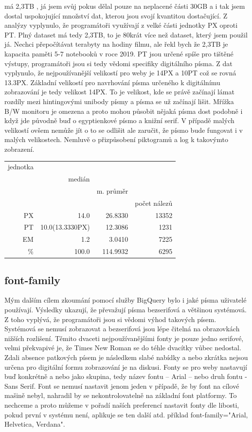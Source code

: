 \documentclass[a4paper]{article}
\begin{document}
{} má 2,3TB , já jsem svůj pokus dělal pouze na neplacené části 30GB a i tak jsem dostal uspokojující množství dat, kterou jsou svojí kvantitou dostačující. Z analýzy vyplynulo, že programátoři využívají z velké části jednotky PX oproti PT. Plný dataset má tedy 2,3TB, to je 80krát více než dataset, který jsem použil já. Nechci přepočítávat terabyty na hodiny filmu, ale řekl bych že 2,3TB je kapacita paměti 5-7 notebooků v roce 2019.  PT jsou určené spíše pro tištěné výstupy, programátoři jsou si tedy vědomi specifiky digitálního písma. Z dat vyplynulo, že nejpoužívanější velikostí pro weby je 14PX a 10PT což se rovná 13.3PX. Základní velikostí pro navrhování písma určeného k digitálnímu zobrazování je tedy velikost 14PX. To je velikost, kde se právě začínají lámat rozdíly mezi hintingovými unibody písmy a písma se už začínají lišit. Mřížka B/W monitoru je omezena a proto mohou působit nějaká písma dost podobně i když jde původně buď o egyptienkové písmo a knižní serif. V případě malých velikostí ovšem nemůže jít o to se odlišit ale zaručit, že písmo bude fungovat i v malých velikostech. Nemluvě o přizpůsobení piktogramů a log k takovýmto zobrazení.

\begin{tabular}{r|rrr}
jednotka & \\
& medián & \\
& & m. průměr & \\
& & & počet nálezů\\
\midrule
PX & 14.0 & 26.8330 &13352 \\
PT & 10.0(13.3330PX)  & 12.3086 & 1231 \\
EM & 1.2 & 3.0410 & 7225 \\
\% & 100.0 & 114.9932 & 6295\\
\end{tabular}

\subsection{font-family}
Mým dalším cílem zkoumání pomocí služby BigQuery bylo i jaké písma uživatelé používají. Výsledky ukazují, že převažují písma bezserifová a většinou systémová. Z toho vyplývá, že programátoři jsou si vědomi výhod takových písem. Systémová se nemusí zobrazovat a bezserifová jsou lépe čitelná na obrazovkách nižších rozlišení. Těmito dvaceti nejpoužívanějšími fonty je pouze jedno serifové, velmi překvapivé je, že Times New Roman se do téhle dvacítky vůbec nedostal. Zdali absence patkových písem je následkem slabé nabídky a nebo zkrátka nejsou určena pro digitální formu zobrazování je na diskusi. Fonty se pro weby nastavují buď konkrétně a nebo jako skupina, tedy název fontu – Arial – nebo druh fontu - Sans Serif. Font se nemusí nastavit jenom jeden v případě, že by font na cílové mašině nebyl, nahradil by se nekontrolovatelně na základní font platformy. To nechceme a proto můžeme v pořadí naších preferencí nastavit fonty dle libosti, pokud první v systému není, aplikuje se ten další atd. příklad font-family="Arial, Helvetica, Verdana".
\end{document}
